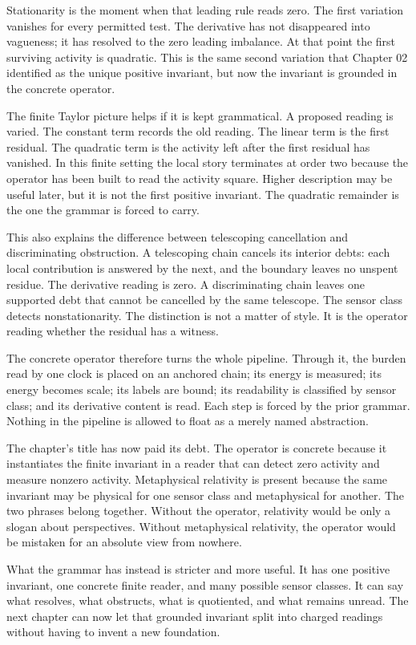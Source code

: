 Stationarity is the moment when that leading rule reads zero. The first
variation vanishes for every permitted test. The derivative has not
disappeared into vagueness; it has resolved to the zero leading imbalance.
At that point the first surviving activity is quadratic. This is the same
second variation that Chapter 02 identified as the unique positive
invariant, but now the invariant is grounded in the concrete operator.

The finite Taylor picture helps if it is kept grammatical. A proposed
reading is varied. The constant term records the old reading. The linear
term is the first residual. The quadratic term is the activity left after
the first residual has vanished. In this finite setting the local story
terminates at order two because the operator has been built to read the
activity square. Higher description may be useful later, but it is not the
first positive invariant. The quadratic remainder is the one the grammar is
forced to carry.

This also explains the difference between telescoping cancellation and
discriminating obstruction. A telescoping chain cancels its interior debts:
each local contribution is answered by the next, and the boundary leaves no
unspent residue. The derivative reading is zero. A discriminating chain
leaves one supported debt that cannot be cancelled by the same telescope.
The sensor class detects nonstationarity. The distinction is not a matter of
style. It is the operator reading whether the residual has a witness.

The concrete operator therefore turns the whole pipeline. Through it, the
burden read by one clock is placed on an anchored chain; its energy is
measured; its energy becomes scale; its labels are bound; its readability is
classified by sensor class; and its derivative content is read. Each step is
forced by the prior grammar. Nothing in the pipeline is allowed to float as
a merely named abstraction.

The chapter's title has now paid its debt. The operator is concrete because
it instantiates the finite invariant in a reader that can detect zero
activity and measure nonzero activity. Metaphysical relativity is present
because the same invariant may be physical for one sensor class and
metaphysical for another. The two phrases belong together. Without the
operator, relativity would be only a slogan about perspectives. Without
metaphysical relativity, the operator would be mistaken for an absolute
view from nowhere.

What the grammar has instead is stricter and more useful. It has one
positive invariant, one concrete finite reader, and many possible sensor
classes. It can say what resolves, what obstructs, what is quotiented, and
what remains unread. The next chapter can now let that grounded invariant
split into charged readings without having to invent a new foundation.
